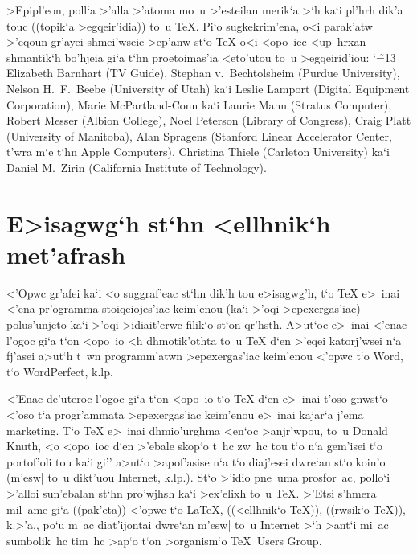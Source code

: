 >Epipl'eon, poll`a >'alla >'atoma mo~u >'esteilan merik`a >`h ka`i
pl'hrh dik'a touc ((topik`a >egqeir'i\-dia)) to~u {\rm \TeX}\null.        
Pi`o sugkekrim'ena, o<i parak'atw >'eqoun gr'ayei shmei'wseic >ep'anw   
st`o {\rm \TeX} o<i <opo~iec <up~hrxan shmantik`h bo'hjeia gi`a t`hn      
proetoimas'ia <eto'utou to~u >egqeirid'iou:
 \begingroup \catcode`\~=13 \rm
 \frenchspacing
Elizabeth Barnhart (TV Guide),
Stephan v.~Bechtolsheim (Purdue University),
Nelson H.~F.~Beebe (University of Utah)
     {\tengr ka`i} Leslie Lamport (Digital Equipment Corporation),
Marie McPart\-land-Conn {\tengr ka`i} Laurie Mann (Stratus Computer),
Robert Messer (Albion College),
Noel Peterson (Library of Congress),
Craig Platt (University of Manitoba),
Alan Spragens (Stanford Linear Accelerator Center, 
     {\tengr t'wra m`e t`hn} Apple Computers),
Christina Thiele (Carleton University)
{\tengr ka`i} Daniel M.~Zirin (California Institute of Technology).
 \endgroup
\vfill\eject

\section{E>isagwg`h st`hn <ellhnik`h met'afrash}

<'Opwc gr'afei ka`i <o suggraf'eac st`hn dik'h tou e>isagwg'h, t`o {\rm
\TeX} e>~inai <'ena pr'ogramma stoiqeiojes'iac keim'enou (ka`i >'oqi
>epexergas'iac) polus'unjeto ka`i >'oqi >idiait'erwc filik`o st`on
qr'hsth.  A>ut`oc e>~inai <'enac l'ogoc gi`a t`on <opo~io <h
dhmotik'othta to~u {\rm \TeX} d`en >'eqei katorj'wsei n`a fj'asei a>ut`h
t~wn programm'atwn >epexergas'iac keim'enou <'opwc t`o {\rm Word}, t`o
{\rm WordPerfect}, k.lp.  

<'Enac de'uteroc l'ogoc gi`a t`on <opo~io t`o {\rm \TeX} d`en e>~inai
t'oso gnwst`o <'oso t`a progr'ammata >epexergas'iac keim'enou e>~inai
kajar`a j'ema {\rm marketing}.  T`o {\rm \TeX} e>~inai dhmio'urghma
<en`oc >an\-jr'w\-pou, to~u {\rm Donald Knuth}, <o <opo~ioc d`en >'ebale
skop`o t~hc zw~hc tou t`o n`a gem'isei t`o portof'oli tou ka`i gi''\NB
a>ut`o >apof'asise n`a t`o diaj'esei dwre`an st`o koin'o (m'esw| to~u
dikt'uou {\rm Internet}, k.lp.).  St`o >'idio pne~uma prosfor~ac,
pollo`i >'alloi sun'ebalan st`hn pro'wjhsh ka`i >ex'elixh to~u {\rm
\TeX}\null.  >'Etsi s'hmera mil~ame gi`a ((pak'eta)) <'opwc t`o {\rm
\LaTeX}, ((<ellhnik`o {\rm \TeX})), ((rwsik`o {\rm \TeX})), k.>'a., po`u
m~ac diat'ijontai dwre`an m'esw| to~u {\rm Internet} >`h >ant`i mi~ac
sumbolik~hc tim~hc >ap`o t`on >organism`o {\rm \TeX\ Users Group}. 

